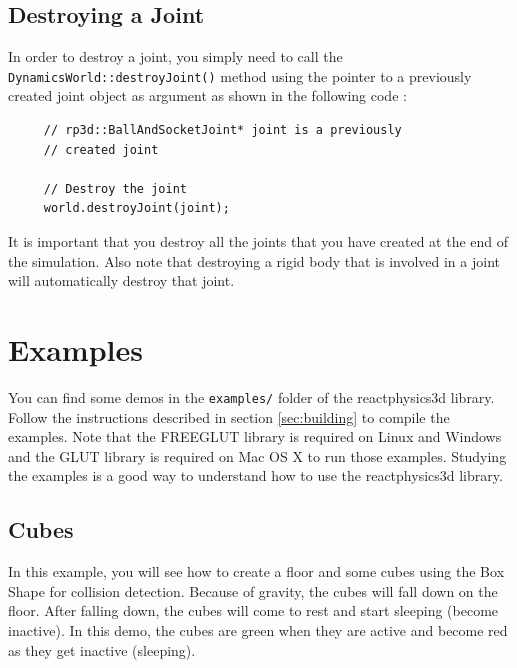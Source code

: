 \documentclass[a4paper,12pt]{article}
\begin{document}
    \subsection{Destroying a Joint}

    \begin{sloppypar}
    In order to destroy a joint, you simply need to call the \texttt{DynamicsWorld::destroyJoint()} method using the pointer to
    a previously created joint object as argument as shown in the following code : \\
   \end{sloppypar}

    \begin{lstlisting}
     // rp3d::BallAndSocketJoint* joint is a previously
     // created joint

     // Destroy the joint
     world.destroyJoint(joint);
  \end{lstlisting}

    \vspace{0.6cm}

    It is important that you destroy all the joints that you have created at the end of the simulation. Also note that destroying a
    rigid body that is involved in a joint will automatically destroy that joint.

    \section{Examples}

    You can find some demos in the \texttt{examples/} folder of
    the reactphysics3d library. Follow the instructions described in section \ref{sec:building} to
    compile the examples. Note that the FREEGLUT library is required on Linux and Windows
    and the GLUT library is required on Mac OS X to run those examples. Studying the examples is a
    good way to understand how to use the reactphysics3d library.

    \subsection{Cubes}

    In this example, you will see how to create a floor and some cubes using the Box Shape for collision detection. Because of gravity,
    the cubes will fall down on the floor. After falling down, the cubes will come to rest and start sleeping (become inactive). In this demo,
    the cubes are green when they are active and become red as they get inactive (sleeping).
\end{document}
